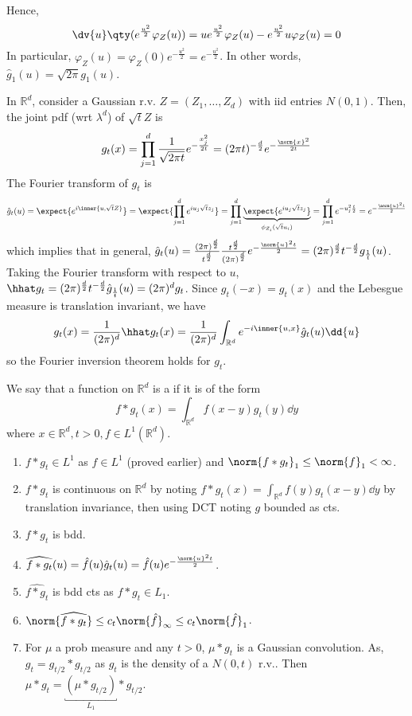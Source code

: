 Hence,
\[ \dv{u}\qty(e^{\frac{u^2}{2}} \varphi_Z(u)) = ue^{\frac{u^2}{2}} \varphi_Z(u) - e^{\frac{u^2}{2}} u \varphi_Z(u) = 0 \]
In particular, $\varphi_Z(u) = \varphi_Z(0) e^{-\frac{u^2}{2}} = e^{-\frac{u^2}{2}}$.
In other words, $\hat g_1(u) = \sqrt{2\pi} g_1(u)$.

In $\mathbb R^d$, consider a Gaussian r.v. $Z = (Z_1, \dots, Z_d)$ with iid entries $N(0,1)$.
Then, the joint pdf (wrt $\lambda^d$) of $\sqrt{t}Z$ is
\[ g_t(x) = \prod_{j=1}^d \frac{1}{\sqrt{2\pi t}} e^{-\frac{x_j^2}{2t}} = (2\pi t)^{-\frac{d}{2}} e^{-\frac{\norm{x}^2}{2t}} \]
The Fourier transform of $g_t$ is
\[ \hat g_t(u) = \expect{e^{i\inner{u,\sqrt{t}Z}}} = \expect{\prod_{j=1}^d e^{iu_j \sqrt{t} z_j}} = \prod_{j=1}^d \underbrace{\expect{e^{iu_j \sqrt{t} z_j}}}_{\phi_{Z_i}(\sqrt{t}u_i)} = \prod_{j=1}^d e^{-u_j^2 \frac{t}{2}} = e^{-\frac{\norm{u}^2 t}{2}} \]
which implies that in general, $\hat g_t(u) = \frac{(2\pi)^{\frac{d}{2}}}{t^{\frac{d}{2}}} \frac{t^{\frac{d}{2}}}{(2\pi)^{\frac{d}{2}}} e^{-\frac{\norm{u}^2 t}{2}} = (2\pi)^{\frac{d}{2}} t^{-\frac{d}{2}} g_{\frac{1}{t}}(u)$.
Taking the Fourier transform with respect to $u$, $\hhat g_t = (2\pi)^{\frac{d}{2}} t^{-\frac{d}{2}} \hat{g}_{\frac{1}{t}}(u) = (2\pi)^d g_t$.
Since $g_t(-x) = g_t(x)$ and the Lebesgue measure is translation invariant, we have
\begin{align*}
	g_t(x) = \frac{1}{(2\pi)^d} \hhat g_t(x) = \frac{1}{(2\pi)^d} \int_{\mathbb R^d} e^{-i\inner{u,x}} \hat g_t(u) \dd{u}
\end{align*}
so the Fourier inversion theorem holds for $g_t$.

\begin{definition}
	We say that a function on $\mathbb R^d$ is a  if it is of the form
	\[ f \ast g_t(x) = \int_{\mathbb R^d} f(x-y) g_t(y) \dd{y} \]
	where $x \in \mathbb R^d, t > 0, f \in L^1(\mathbb R^d)$.
\end{definition}

\begin{enumerate}
	\item $f \ast g_t \in L^1$ as $f \in L^1$ (proved earlier) and $\norm{f \ast g_t}_1 \leq \norm{f}_1 < \infty$.
	\item $f \ast g_t$ is continuous on $\mathbb R^d$ by noting $f \ast g_t(x) = \int_{\mathbb R^d} f(y) g_t(x-y) \dd{y}$ by translation invariance, then using DCT noting $g$ bounded as cts.
	\item $f \ast g_t$ is bdd.
	\item  $\widehat{f \ast g_t}(u) = \hat{f}(u) \hat{g}_t(u) = \hat{f}(u) e^{-\frac{\norm{u}^2 t}{2}}$.
	\item $\widehat{f \ast g_t}$ is bdd cts as $f \ast g_t \in L_1$.
	\item $\norm{\widehat{f \ast g_t}} \leq c_t \norm{\hat{f}}_\infty \leq c_t \norm{\hat{f}}_1$.
	\item For $\mu$ a prob measure and any $t > 0$, $\mu \ast g_t$ is a Gaussian convolution. As, $g_t = g_{t / 2} \ast g_{t / 2}$ as $g_t$ is the density of a $N(0, t)$ r.v.. Then $\mu \ast g_t = \underbracket{(\mu \ast g_{t / 2})}_{L_1} \ast g_{t / 2}$.
\end{enumerate}

